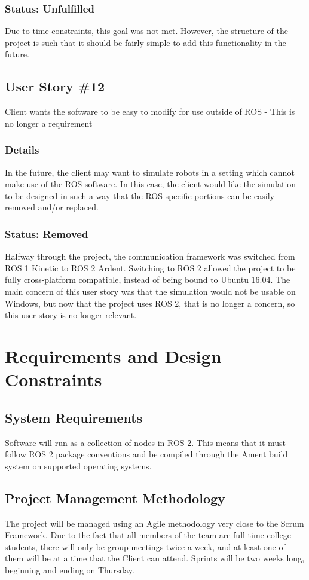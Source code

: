 \subsubsection*{Status: Unfulfilled}
Due to time constraints, this goal was not met. However, the structure of the project is such that it should be fairly simple to add this functionality in the future.

\subsection{User Story \#12} 
Client wants the software to be easy to modify for use outside of ROS - This is no longer a requirement

\subsubsection*{Details}
In the future, the client may want to simulate robots in a setting which cannot make use of the ROS software. In this case, the client would like the simulation to be designed in such a way that the ROS-specific portions can be easily removed and/or replaced.

\subsubsection*{Status: Removed}
Halfway through the project, the communication framework was switched from ROS 1 Kinetic to ROS 2 Ardent. Switching to ROS 2 allowed the project to be fully cross-platform compatible, instead of being bound to Ubuntu 16.04. The main concern of this user story was that the simulation would not be usable on Windows, but now that the project uses ROS 2, that is no longer a concern, so this user story is no longer relevant.

\section{Requirements and Design Constraints}
\subsection{System  Requirements}
Software will run as a collection of nodes in ROS 2. This means that it must follow ROS 2 package conventions and be compiled through the Ament build system on supported operating systems.

\subsection{Project  Management Methodology}
The project will be managed using an Agile methodology very close to the Scrum Framework. Due to the fact that all members of the team are full-time college students, there will only be group meetings twice a week, and at least one of them will be at a time that the Client can attend. Sprints will be two weeks long, beginning and ending on Thursday.

